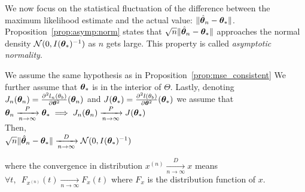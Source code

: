 We now focus on the statistical fluctuation of the difference between the
maximum likelihood estimate and the actual value: $\|\hat{\thetab}_n -
\thetab_*\|$. Proposition~\ref{prop:asymp:norm} states that
$\sqrt{n}\|\hat{\thetab}_n - \thetab_*\|$ approaches the normal density
$\Ncal(0, I(\thetab_*)^{-1})$ as $n$ gets large. This property is called \emph{asymptotic normality}.

\begin{prop}
  \label{prop:asymp:norm}
  We assume the same hypothesis as in Proposition~\ref{prop:mse_consistent}
  We further assume that $\thetab_*$ is in the interior of $\Theta$.
  Lastly, denoting $J_n(\thetab_n) =
  \partialfrac{\thetab^2}{^2l_n(\theta_b)}(\thetab_n)$ and $J(\thetab_*) =
  \partialfrac{\thetab^2}{^2l(\theta_b)}(\thetab_*)$ we assume that \\
  $\thetab_n \xrightarrow[n \rightarrow
  \infty]{P} \thetab_* \implies J_n(\thetab_n) \xrightarrow[n \rightarrow
  \infty]{P} J(\thetab_*)$\\
  Then, \\
  $\sqrt{n} \| \hat{\thetab}_n - \thetab_* \| \xrightarrow[n \rightarrow
  \infty]{D}  \Ncal(0,
  I(\thetab_*)^{-1})$
\end{prop}
where the convergence in distribution $ x^{(n)} \xrightarrow[n \rightarrow \infty]{D} x$ means  $\forall t, \enspace F_{x^{(n)}}(t)
\xrightarrow[n \rightarrow \infty]{} F_x(t)$ where $F_x$ is the distribution
function of $x$.
